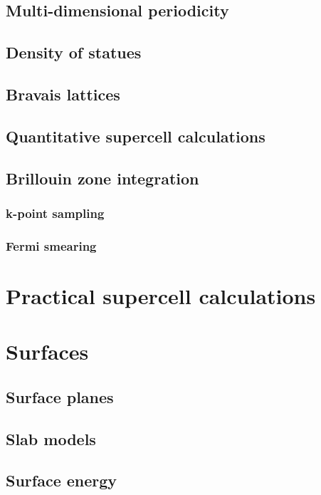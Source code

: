 \documentclass[11pt]{article}
\begin{document}
\subsection{Multi-dimensional periodicity}
\label{sec:orgeab8fd3}
\subsection{Density of statues}
\label{sec:orgcea6563}
\subsection{Bravais lattices}
\label{sec:org728d7e3}
\subsection{Quantitative supercell calculations}
\label{sec:org39e3cc1}
\subsection{Brillouin zone integration}
\label{sec:orge9a2a07}
\subsubsection{k-point sampling}
\label{sec:orgcbb1ef0}
\subsubsection{Fermi smearing}
\label{sec:org99f9a96}
\newpage
\section{Practical supercell calculations}
\label{sec:org62984f6}
\newpage
\section{Surfaces}
\label{sec:org3a8552c}
\subsection{Surface planes}
\label{sec:org034024b}
\subsection{Slab models}
\label{sec:org0bf27ab}
\subsection{Surface energy}
\label{sec:orgdab2fb3}
\end{document}
